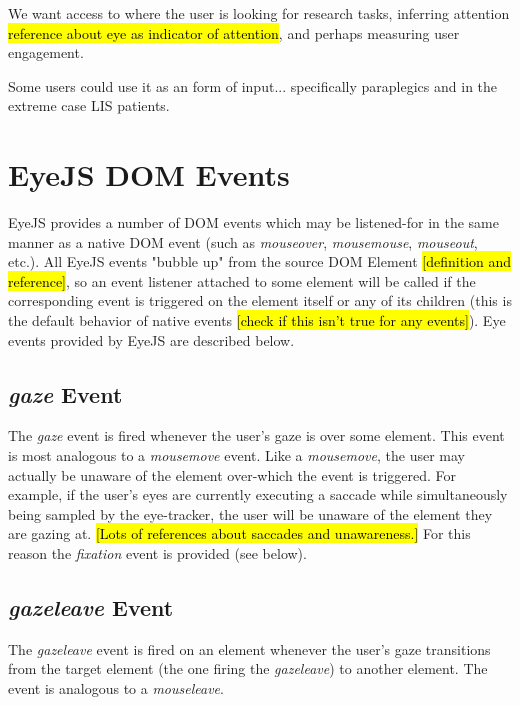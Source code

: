 \documentclass{sigchi}
\begin{document}
We want access to where the user is looking for research tasks, 
inferring attention \hl{reference about eye as indicator of attention},
and perhaps measuring user engagement.

Some users could use it as an form of input... specifically 
paraplegics and in the extreme case LIS patients.



\section{EyeJS DOM Events}
EyeJS provides a number of DOM events which may be listened-for in
the same manner as a native DOM event (such as \textit{mouseover}, \textit{mousemouse}, \textit{mouseout}, etc.). All EyeJS events
"bubble up" from the source DOM Element \hl{[definition and reference]},
so an event listener attached to some element will be called if the
corresponding event is triggered on the element itself or any of its
children (this is the default behavior of native events \hl{[check
if this isn't true for any events]}). Eye events provided by EyeJS
are described below.

\subsection{\textbf{\textit{gaze}} Event}
The \textit{gaze} event is fired whenever the user's gaze is over some
element. This event is most analogous to a \textit{mousemove} event.
Like a \textit{mousemove}, the user may actually be unaware of the
element over-which the event is triggered. For example, if the user's
eyes are currently executing a saccade while simultaneously being
sampled by the eye-tracker, the user will be unaware of the element they
are gazing at. \hl{[Lots of references about saccades and unawareness.]}
For this reason the \textit{fixation} event is provided (see below).

\subsection{\textbf{\textit{gazeleave}} Event}
The \textit{gazeleave} event is fired on an element whenever the 
user's gaze transitions from the target element (the one firing the
\textit{gazeleave}) to another element. The event is analogous to a \textit{mouseleave}.
\end{document}
